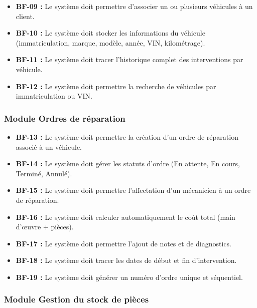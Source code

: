 \begin{itemize}
    \item \textbf{BF-09 :} Le système doit permettre d'associer un ou plusieurs véhicules à un client.
    
    \item \textbf{BF-10 :} Le système doit stocker les informations du véhicule (immatriculation, marque, modèle, année, VIN, kilométrage).
    
    \item \textbf{BF-11 :} Le système doit tracer l'historique complet des interventions par véhicule.
    
    \item \textbf{BF-12 :} Le système doit permettre la recherche de véhicules par immatriculation ou VIN.
\end{itemize}

\subsubsection{Module Ordres de réparation}

\begin{itemize}
    \item \textbf{BF-13 :} Le système doit permettre la création d'un ordre de réparation associé à un véhicule.
    
    \item \textbf{BF-14 :} Le système doit gérer les statuts d'ordre (En attente, En cours, Terminé, Annulé).
    
    \item \textbf{BF-15 :} Le système doit permettre l'affectation d'un mécanicien à un ordre de réparation.
    
    \item \textbf{BF-16 :} Le système doit calculer automatiquement le coût total (main d'œuvre + pièces).
    
    \item \textbf{BF-17 :} Le système doit permettre l'ajout de notes et de diagnostics.
    
    \item \textbf{BF-18 :} Le système doit tracer les dates de début et fin d'intervention.
    
    \item \textbf{BF-19 :} Le système doit générer un numéro d'ordre unique et séquentiel.
\end{itemize}

\subsubsection{Module Gestion du stock de pièces}

